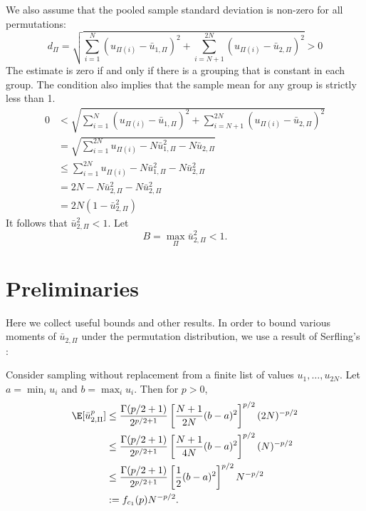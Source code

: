 We also assume that the pooled sample standard deviation is non-zero for all permutations:
\begin{equation}
  \label{A:non-zero-std-dev}
  d_\Pi = \sqrt{\sum_{i=1}^N(u_{\Pi(i)} - \bar{u}_{1,\Pi})^2 + \sum_{i=N+1}^{2N}(u_{\Pi(i)} -
    \bar{u}_{2,\Pi})^2} > 0
\end{equation}
The estimate is zero if and only if there is a grouping that is constant in each group.  The
condition also implies that the sample mean for any group is strictly less than 1.
\begin{align*}
  0 &< \sqrt{\sum_{i=1}^N(u_{\Pi(i)} - \bar{u}_{1,\Pi})^2 + \sum_{i=N+1}^{2N}(u_{\Pi(i)} -
    \bar{u}_{2,\Pi})^2} \\
  &= \sqrt{\sum_{i=1}^{2N} u_{\Pi(i)} - N \bar{u}_{1,\Pi}^2 - N \bar{u}_{2,\Pi}} \\
  &\leq \sum_{i=1}^{2N} u_{\Pi(i)} - N \bar{u}_{1,\Pi}^2 - N \bar{u}_{2,\Pi}^2 \\
  &= 2N - N \bar{u}_{2,\Pi}^2 - N \bar{u}_{2,\Pi}^2 \\
  &= 2N(1 - \bar{u}_{2,\Pi}^2)
\end{align*}
It follows that $\bar{u}_{2,\Pi}^2 < 1$.  Let
\begin{equation}
  \label{A:B}
  B = \max_\Pi \bar{u}_{2,\Pi}^2 < 1.
\end{equation}

\section{Preliminaries}
Here we collect useful bounds and other results.  In order to bound various moments of
$\bar{u}_{2,\Pi}$ under the permutation distribution, we use a result of Serfling's
\cite{serfling1974probability}:
\begin{proposition}
  Consider sampling without replacement from a finite list of values
  $u_1, \ldots, u_{2N}$.  Let $a = \min_i u_{i}$ and $b = \max_i u_{i}$.
  Then for $p > 0$,
  \begin{align}
    \E [\bar{u}_{2,\Pi}^p] 
    &\leq \frac{\Gamma(p/2 + 1)}{2^{p/2 + 1}}
    \left [ \frac{N+1}{2N}(b-a)^2 \right ]^{p/2}
    (2N)^{-p/2} \nonumber \\
    &\leq \frac{\Gamma(p/2 + 1)}{2^{p/2 + 1}}
    \left [ \frac{N+1}{4N}(b-a)^2 \right ]^{p/2}
    (N)^{-p/2} \nonumber \\
    &\leq \frac{\Gamma(p/2 + 1)}{2^{p/2 + 1}}
    \left [ \frac{1}{2}(b-a)^2 \right ]^{p/2}
    N^{-p/2} \nonumber \\
    &:= f_{c_1}(p)N^{-p/2} \label{def:serfling}.
  \end{align}
\end{proposition}

